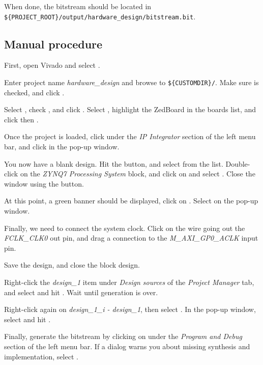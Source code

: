 \documentclass[openany,a4paper]{book}
\begin{document}
When done, the bitstream should be located in \nolinkurl{${PROJECT_ROOT}/output/hardware_design/bitstream.bit}.

\subsection{Manual procedure}

First, open Vivado and select .

Enter project name \textit{hardware\_design} and browse to \nolinkurl{${CUSTOMDIR}/}.
Make sure  is checked, and click .

Select , check , and click .
Select , highlight the ZedBoard in the boards list, and click  then .

Once the project is loaded, click  under the \textit{IP Integrator} section of the left menu bar, and click  in the pop-up window.

You now have a blank design.
Hit the  button, and select  from the list.
Double-click on the \textit{ZYNQ7 Processing System} block, and click on  and select .
Close the window using the  button.

At this point, a green banner should be displayed, click on .
Select  on the pop-up window.

Finally, we need to connect the system clock.
Click on the wire going out the \textit{FCLK\_CLK0} out pin, and drag a connection to the \textit{M\_AXI\_GP0\_ACLK} input pin.

Save the design, and close the block design.

Right-click the \textit{design\_1} item under \textit{Design sources} of the \textit{Project Manager} tab, and select  and hit .
Wait until generation is over.

Right-click again on \textit{design\_1\_i - design\_1}, then select .
In the pop-up window, select  and hit .

Finally, generate the bitstream by clicking on  under the \textit{Program and Debug} section of the left menu bar.
If a dialog warns you about missing synthesis and implementation, select .
\end{document}
